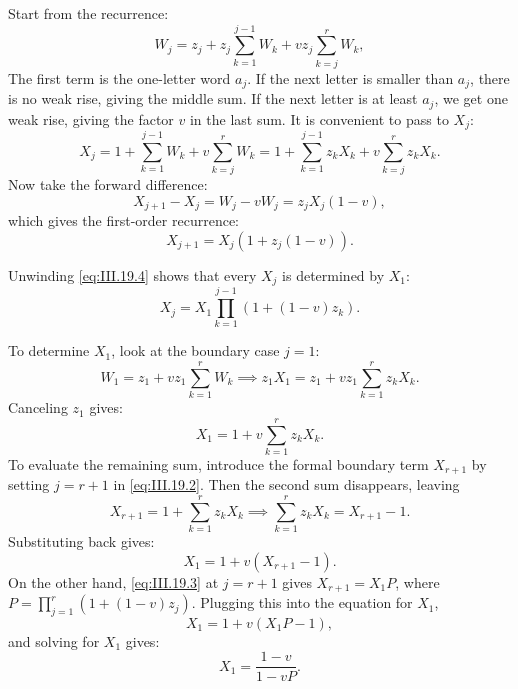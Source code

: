 Start from the recurrence:
\begin{equation} \label{eq:III.19.1}
    W_{j} = z_{j} + z_{j} \sum_{k = 1}^{j - 1} W_{k} + vz_{j} \sum_{k = j}^{r} W_{k},
\end{equation}
The first term is the one-letter word $a_j$. If the next letter is smaller than $a_j$, there is
no weak rise, giving the middle sum. If the next letter is at least $a_j$, we get one weak rise,
giving the factor $v$ in the last sum.
It is convenient to pass to $X_j$:
\begin{equation} \label{eq:III.19.2}
    X_{j} = 1 + \sum_{k = 1}^{j - 1} W_{k} + v \sum_{k = j}^{r} W_{k} = 1 + \sum_{k = 1}^{j - 1} z_{k}X_{k} + v \sum_{k = j}^{r} z_{k}X_{k}.
\end{equation}
Now take the forward difference:
\begin{equation*}
    X_{j + 1} - X_{j} = W_{j} - vW_{j} = z_{j}X_{j}(1 - v),
\end{equation*}
which gives the first-order recurrence:
\begin{equation} \label{eq:III.19.4}
    X_{j + 1} = X_{j}(1 + z_{j}(1 - v)).
\end{equation}

Unwinding \eqref{eq:III.19.4} shows that every $X_j$ is determined by $X_1$:
\begin{equation} \label{eq:III.19.3}
    X_{j} = X_{1} \prod_{k = 1}^{j - 1}(1 + (1 - v)z_{k}).
\end{equation}

To determine $X_1$, look at the boundary case $j = 1$:
\begin{equation*}
    W_{1} = z_{1} + vz_{1} \sum_{k = 1}^{r} W_{k} \implies z_{1}X_{1} = z_{1} + vz_{1} \sum_{k = 1}^{r} z_{k}X_{k}.
\end{equation*}
Canceling $z_{1}$ gives:
\begin{equation*}
    X_{1} = 1 + v \sum_{k = 1}^{r} z_{k}X_{k}.
\end{equation*}
To evaluate the remaining sum, introduce the formal boundary term $X_{r + 1}$ by setting $j = r + 1$ in \eqref{eq:III.19.2}. Then the second sum disappears, leaving
\begin{equation*}
    X_{r + 1} = 1 + \sum_{k = 1}^{r} z_{k}X_{k} \implies \sum_{k = 1}^{r} z_{k}X_{k} = X_{r + 1} - 1.
\end{equation*}
Substituting back gives:
\begin{equation*}
    X_{1} = 1 + v(X_{r + 1} - 1).
\end{equation*}
On the other hand, \eqref{eq:III.19.3} at $j = r + 1$ gives $X_{r + 1} = X_{1}P$, where
$P = \prod_{j = 1}^{r}(1 + (1 - v)z_{j})$. Plugging this into the equation for $X_1$,
\begin{equation*}
    X_{1} = 1 + v(X_{1}P - 1),
\end{equation*}
and solving for $X_1$ gives:
\begin{equation} \label{eq:III.19.5}
    X_{1} = \frac{1 - v}{1 - vP}.
\end{equation}

